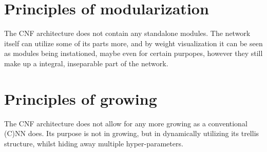 \documentclass[a4paper,twocolumn]{article}
\begin{document}
\section{Principles of modularization}
The CNF architecture does not contain any standalone modules. The network itself can utilize some of its parts more, and by weight visualization it can be seen as modules being instationed, maybe even for certain purpopes, however they still make up a integral, inseparable part of the network.

\section{Principles of growing}
The CNF architecture does not allow for any more growing as a conventional (C)NN does. Its purpose is not in growing, but in dynamically utilizing its trellis structure, whilst hiding away multiple hyper-parameters.
\end{document}
